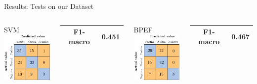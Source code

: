 \documentclass{beamer}
\begin{document}
\begin{frame}{Results: Tests on our Dataset}
{			\begin{columns}
				\centering
				SVM\vspace{0.7cm}\\
				\includegraphics[width=0.6\linewidth]{figures/ita_snt_svm_afs.pdf}\\
				\begin{table}
					\centering
					\begin{tabular}{| c | c |}
						\hline
						\textbf{F1-macro} & 0.451 \\
						\hline
					\end{tabular}
				\end{table}
				
				\centering
				BPEF\vspace{0.7cm}\\
				\includegraphics[width=0.6\linewidth]{figures/ita_snt_bpef_afs.pdf}\\
				\begin{table}
					\centering
					\begin{tabular}{| c | c |}
						\hline
						\textbf{F1-macro} & 0.467 \\
						\hline
					\end{tabular}
				\end{table}
				

\end{columns}}
\end{frame}
\end{document}
